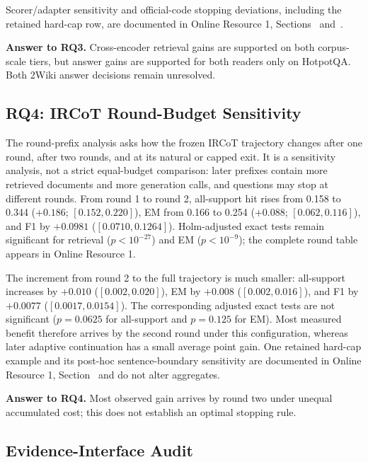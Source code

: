 

Scorer/adapter sensitivity and official-code stopping deviations, including the retained hard-cap row, are documented in Online Resource 1, Sections~ and~.

\noindent\textbf{Answer to RQ3.} Cross-encoder retrieval gains are supported on both corpus-scale tiers, but answer gains are supported for both readers only on HotpotQA. Both 2Wiki answer decisions remain unresolved.

\subsection{RQ4: IRCoT Round-Budget Sensitivity}
\label{sec:rq4_round_budget}

The round-prefix analysis asks how the frozen IRCoT trajectory changes after one round, after two rounds, and at its natural or capped exit. It is a sensitivity analysis, not a strict equal-budget comparison: later prefixes contain more retrieved documents and more generation calls, and questions may stop at different rounds. From round 1 to round 2, all-support hit rises from 0.158 to 0.344 ($+0.186$; $[0.152,0.220]$), EM from 0.166 to 0.254 ($+0.088$; $[0.062,0.116]$), and F1 by $+0.0981$ ($[0.0710,0.1264]$). Holm-adjusted exact tests remain significant for retrieval ($p<10^{-27}$) and EM ($p<10^{-9}$); the complete round table appears in Online Resource 1.

The increment from round 2 to the full trajectory is much smaller: all-support increases by $+0.010$ ($[0.002,0.020]$), EM by $+0.008$ ($[0.002,0.016]$), and F1 by $+0.0077$ ($[0.0017,0.0154]$). The corresponding adjusted exact tests are not significant ($p=0.0625$ for all-support and $p=0.125$ for EM). Most measured benefit therefore arrives by the second round under this configuration, whereas later adaptive continuation has a small average point gain. One retained hard-cap example and its post-hoc sentence-boundary sensitivity are documented in Online Resource 1, Section~ and do not alter aggregates.

\noindent\textbf{Answer to RQ4.} Most observed gain arrives by round two under unequal accumulated cost; this does not establish an optimal stopping rule.



\subsection{Evidence-Interface Audit}
\label{sec:evidence_interface_audit}

